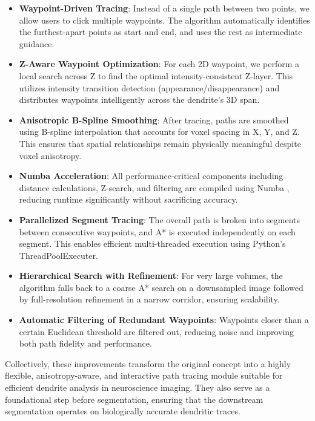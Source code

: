 \begin{itemize}
    

\item{\textbf{Waypoint-Driven Tracing}: Instead of a single path between two points, we allow users to click multiple waypoints. The algorithm automatically identifies the furthest-apart points as start and end, and uses the rest as intermediate guidance.}

\item{\textbf{Z-Aware Waypoint Optimization}: For each 2D waypoint, we perform a local search across Z to find the optimal intensity-consistent Z-layer. This utilizes intensity transition detection (appearance/disappearance) and distributes waypoints intelligently across the dendrite’s 3D span.}

\item{\textbf{Anisotropic B-Spline Smoothing}: After tracing, paths are smoothed using B-spline interpolation that accounts for voxel spacing in X, Y, and Z. This ensures that spatial relationships remain physically meaningful despite voxel anisotropy.}

\item{\textbf{Numba Acceleration}: All performance-critical components including distance calculations, Z-search, and filtering are compiled using Numba \cite{Lam_2015}, reducing runtime significantly without sacrificing accuracy.}

\item{\textbf{Parallelized Segment Tracing}: The overall path is broken into segments between consecutive waypoints, and A* is executed independently on each segment. This enables efficient multi-threaded execution using Python’s ThreadPoolExecuter.}

\item{\textbf{Hierarchical Search with Refinement}: For very large volumes, the algorithm falls back to a coarse A* search on a downsampled image followed by full-resolution refinement in a narrow corridor, ensuring scalability.}

\item{\textbf{Automatic Filtering of Redundant Waypoints}: Waypoints closer than a certain Euclidean threshold are filtered out, reducing noise and improving both path fidelity and performance.}
\end{itemize}

Collectively, these improvements transform the original concept into a highly flexible, anisotropy-aware, and interactive path tracing module suitable for efficient dendrite analysis in neuroscience imaging. They also serve as a foundational step before segmentation, ensuring that the downstream segmentation operates on biologically accurate dendritic traces.

